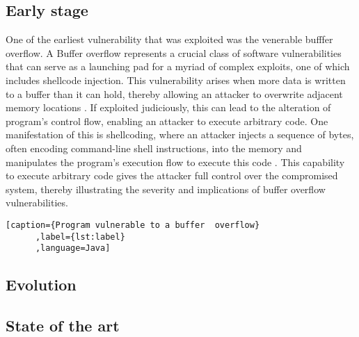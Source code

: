 \documentclass{article}
\begin{document}
\subsection{Early stage}
\begin{comment}
  shellcoding
  reference smashing the stack for fun and profit
\end{comment}
One of the earliest vulnerability that was exploited was the venerable bufffer
overflow. A Buffer overflow represents a crucial class of software
vulnerabilities that can serve as a launching pad for a myriad of complex
exploits, one of which includes shellcode injection. This vulnerability arises
when more data is written to a buffer than it can hold, thereby allowing an
attacker to overwrite adjacent memory locations \cite{seacord2013}. If exploited
judiciously, this can lead to the alteration of program's control flow, enabling
an attacker to execute arbitrary code. One manifestation of this is shellcoding,
where an attacker injects a sequence of bytes, often encoding command-line shell
instructions, into the memory and manipulates the program's execution flow to
execute this code \cite{one1996smashing}. This capability to execute arbitrary
code gives the attacker full control over the compromised system, thereby
illustrating the severity and implications of buffer overflow vulnerabilities.

\begin{lstlisting}[caption={Program vulnerable to a buffer  overflow}
      ,label={lst:label}
      ,language=Java]

\end{lstlisting}

\subsection{Evolution}
\begin{comment}
  ret2libc
  Mention the lack of mitigation
  Rise of heap based exploits due to browsers and JS
  Research some linux&windows kernel exploits
\end{comment}
\subsection{State of the art}
\begin{comment}
  Rise of the hypervizor exploits (showcase some virtualbox exploits, maybe
  vmware hyperv) RCE Exploits mostly slowing down Common techniques no longer
  being effective (check offbyonesec talk about windows kernel exploitation, talk
  about)
\end{comment}
\end{document}
